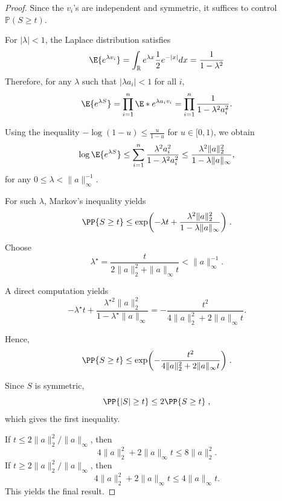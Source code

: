 \documentclass{article}
\newcommand{\R}{\mathbb{R}}
\newcommand{\1}{\mathds{1}}
\DeclarePairedDelimiter{\paren}{\lparen}{\rparen}
\theoremstyle{plain}
\theoremstyle{definition}
\theoremstyle{remark}
\begin{document}
\begin{proof}
Since the $v_i$'s are independent and symmetric,
it suffices to control $\mathbb P(S\geq t)$.



For $|\lambda|<1$, the Laplace distribution satisfies
\begin{equation}
    \E{e^{\lambda v_i}} = \int_{\R} e^{\lambda x} \frac{1}{2} e^{-|x|} dx  = \frac{1}{1-\lambda^2}
\end{equation}
Therefore, for any $\lambda$ such that $|\lambda a_i|<1$ for all $i$,
\begin{equation}
    \E{e^{\lambda S}}
    = \prod_{i=1}^n  \E*{e^{\lambda a_i v_i}} = \prod_{i=1}^n \frac{1}{1-\lambda^2 a_i^2}.
\end{equation}

Using the inequality $-\log(1-u)\le \frac{u}{1-u}$ for $u\in[0,1)$,
we obtain
\begin{equation}
    \log \E{e^{\lambda S}} 
    \leq 
    \sum_{i=1}^n \frac{\lambda^2 a_i^2}{1-\lambda^2 a_i^2}
    \leq 
    \frac{\lambda^2 \|a\|_2^2}{1-\lambda\|a\|_\infty},
\end{equation}
for any $0\le \lambda < \|a\|_\infty^{-1}$.

For such $\lambda$, Markov's inequality yields
\begin{equation}
    \PP{S\geq t}
    \leq 
    \exp \paren*{-\lambda t + \frac{\lambda^2 \|a\|_2^2}{1-\lambda\|a\|_\infty}} \;.
\end{equation}

Choose
\begin{equation}
    \lambda^\star
=
\frac{t}{2\|a\|_2^2 + \|a\|_\infty t}
< \|a\|_\infty^{-1}.
\end{equation}

A direct computation yields
\begin{equation}
    -\lambda^\star t
+
\frac{\lambda^{\star 2}\|a\|_2^2}{1-\lambda^\star\|a\|_\infty}
=
-\frac{t^2}{4\|a\|_2^2 + 2\|a\|_\infty t}.
\end{equation}

Hence,
\begin{equation}
    \PP{S\geq t}
    \leq 
    \exp \paren*{-\frac{t^2}{4\|a\|_2^2 + 2\|a\|_\infty t}} \;.
\end{equation}


Since $S$ is symmetric,
\begin{equation}
    \PP{|S|\geq t}
    \leq 
    2 \PP{S \geq t} \;,
\end{equation}
which gives the first inequality.


If $t\le 2\|a\|_2^2/\|a\|_\infty$, then
\begin{equation}
    4\|a\|_2^2 + 2\|a\|_\infty t \le 8\|a\|_2^2.
\end{equation}
If $t\ge 2\|a\|_2^2/\|a\|_\infty$, then
\begin{equation}
    4\|a\|_2^2 + 2\|a\|_\infty t \le 4\|a\|_\infty t.
\end{equation}
This yields the final result.
\end{proof}
\end{document}
